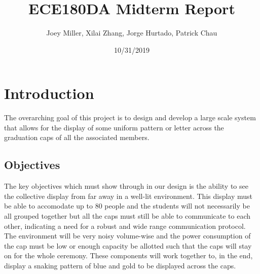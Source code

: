 \documentclass[12pt,letterpaper]{article}
\title{ECE180DA Midterm Report}
\author{Joey Miller, Xilai Zhang, Jorge Hurtado, Patrick Chau}
\date{10/31/2019}
\begin{document}
\maketitle
\section{Introduction}

The overarching goal of this project is to design and develop a large scale system that allows for the display of some uniform pattern or letter across the graduation caps of all the associated members. 

    \subsection{Objectives}
    The key objectives which must show through in our design is the ability to see the collective display from far away in a well-lit environment. This display must be able to accomodate up to 80 people and the students will not necessarily be all grouped together but all the caps must still be able to communicate to each other, indicating a need for a robust and wide range communication protocol. The environment will be very noisy volume-wise and the power consumption of the cap must be low or enough capacity be allotted such that the caps will stay on for the whole ceremony. These components will work together to, in the end, display a snaking pattern of blue and gold to be displayed across the caps. 
\end{document}
